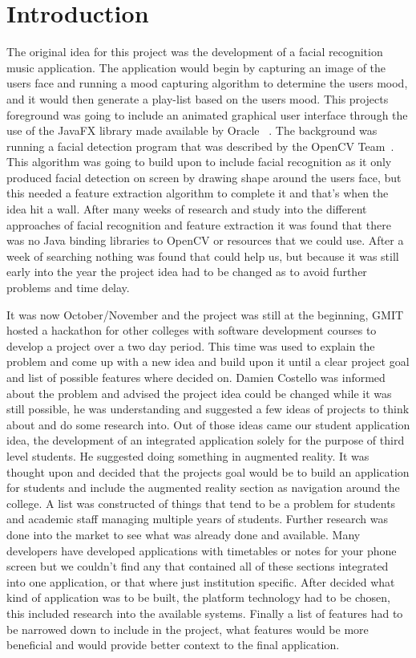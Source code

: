 \chapter{Introduction}
The original idea for this project was the development of a facial recognition music application. The application would begin by capturing an image of the users face and running a mood capturing algorithm to determine the users mood, and it would then generate a play-list based on the users mood. This projects foreground was going to include an animated graphical user interface through the use of the JavaFX library made available by Oracle ~\cite{javafx}. The background was running a facial detection program that was described by the OpenCV Team~\cite{opencv}. This algorithm was going to build upon to include facial recognition as it only produced facial detection on screen by drawing shape around the users face, but this needed a feature extraction algorithm to complete it and that's when the idea hit a wall. After many weeks of research and study into the different approaches of facial recognition and feature extraction it was found that there was no Java binding libraries to OpenCV or resources that we could use. After a week of searching nothing was found that could help us, but because it was still early into the year the project idea had to be changed as to avoid further problems and time delay.

It was now October/November and the project was still at the beginning, GMIT hosted a hackathon for other colleges with software development courses to develop a project over a two day period. This time was used to explain the problem and come up with a new idea and build upon it until a clear project goal and list of possible features where decided on. Damien Costello was informed about the problem and advised the project idea could be changed while it was still possible, he was understanding and suggested a few ideas of projects to think about and do some research into. Out of those ideas came our student application idea, the development of an integrated application solely for the purpose of third level students. He suggested doing something in augmented reality. It was thought upon and decided that the projects goal would be to build an application for students and include the augmented reality section as navigation around the college. A list was constructed of things that tend to be a problem for students and academic staff managing multiple years of students. Further research was done into the market to see what was already done and available. Many developers have developed applications with timetables or notes for your phone screen but we couldn't find any that contained all of these sections integrated into one application, or that where just institution specific. After decided what kind of application was to be built, the platform technology had to be chosen, this included research into the available systems. Finally a list of features had to be narrowed down to include in the project, what features would be more beneficial and would provide better context to the final application.

